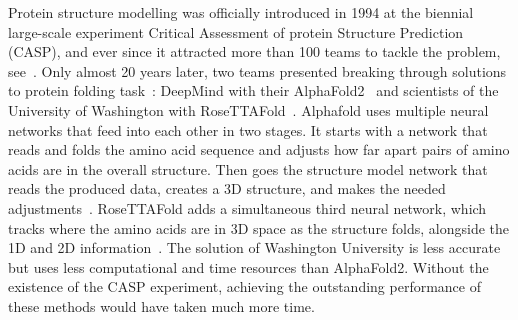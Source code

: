 \documentclass[twoside,11pt]{article}
\begin{document}
Protein structure modelling was officially introduced in 1994 at the biennial large-scale experiment Critical Assessment of protein Structure Prediction (CASP), and ever since it attracted more than 100 teams to tackle the problem, see~\citep{CASP04}. Only almost 20 years later, two teams presented breaking through solutions to protein folding task~\citep{CASP21}: DeepMind with their AlphaFold2~\citep{Jumper2021HighlyAP} and scientists of the University of Washington with RoseTTAFold~\citep{RosettaFold}. 
Alphafold uses multiple neural networks that feed into each other in two stages. It starts with a network that reads and folds the amino acid sequence and adjusts how far apart pairs of amino acids are in the overall structure. Then goes the structure model network that reads the produced data, creates a 3D structure, and makes the needed adjustments~\citep{casp13,Jumper2021HighlyAP}.
RoseTTAFold adds a simultaneous third neural network, which tracks where the amino acids are in 3D space as the structure folds, alongside the 1D and 2D information~\citep{RosettaFold}. The solution of Washington University is less accurate but uses less computational and time resources than AlphaFold2. Without the existence of the CASP experiment, achieving the outstanding performance of these methods would have taken much more time. 
\end{document}
